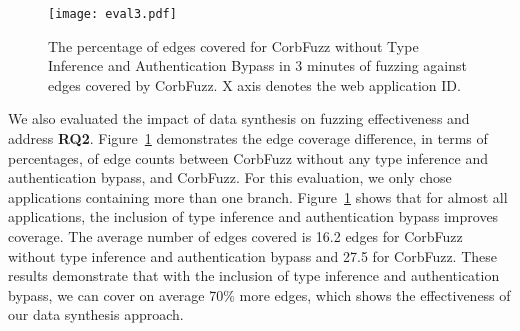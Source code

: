 \documentclass[10pt,conference]{IEEEtran}
\begin{document}
\begin{figure} [h] \small
\hspace*{-9mm}
    \centering
    \texttt{[image: eval3.pdf]}
    \caption{The percentage of edges covered for CorbFuzz without Type Inference and Authentication Bypass in 3 minutes of fuzzing against edges covered by CorbFuzz. X axis denotes the web application ID.}
    \label{fig:edge-cover-perc}

\end{figure}


We also evaluated the impact of data synthesis on fuzzing effectiveness and address \textbf{RQ2}. Figure~\ref{fig:edge-cover-perc} demonstrates the edge coverage difference, in terms of percentages, of edge counts between CorbFuzz without any type inference and authentication bypass, and CorbFuzz. For this evaluation, we only chose applications containing more than one branch. Figure~\ref{fig:edge-cover-perc} shows that for almost all applications, the inclusion of type inference and authentication bypass improves coverage. The average number of edges covered is 16.2 edges for CorbFuzz without type inference and authentication bypass and 27.5 for CorbFuzz. These results demonstrate that with the inclusion of type inference and authentication bypass, we can cover on average 70\% more edges, which shows the effectiveness of our data synthesis approach.
\end{document}
